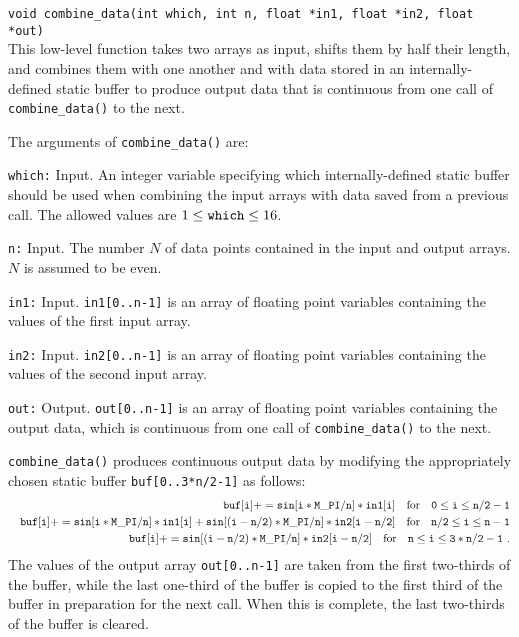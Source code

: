 {\tt void combine\_data(int which, int n, float *in1, float *in2, 
float *out)}\\
%
This low-level function takes two arrays as input, shifts them by half 
their length, and combines them with one another and with data stored in 
an internally-defined static buffer to produce output data that is 
continuous from one call of {\tt combine\_data()} to the next.

The arguments of {\tt combine\_data()} are:
\begin{description}
%
\item{\tt which:} Input.
An integer variable specifying which internally-defined static
buffer should be used when combining the input arrays with data
saved from a previous call.
The allowed values are $1\le{\tt which}\le 16$.
\item{\tt n:} Input. 
The number $N$ of data points contained in the input and output arrays.
$N$ is assumed to be even.
%
\item{\tt in1:} Input.  
{\tt in1[0..n-1]} is an array of floating point variables containing
the values of the first input array.
%
\item{\tt in2:} Input.  
{\tt in2[0..n-1]} is an array of floating point variables containing
the values of the second input array.
%
\item{\tt out:} Output.  
{\tt out[0..n-1]} is an array of floating point variables 
containing the output data, which is continuous from one call of
{\tt combine\_data()} to the next.
%
\end{description}

{\tt combine\_data()} produces continuous output data by modifying 
the appropriately chosen static buffer {\tt buf[0..3*n/2-1]} as follows:
%
\begin{eqnarray}
&&{\tt buf[i]+=sin[i*M\_PI/n]*in1[i]}\quad{\rm for}\quad
{\tt 0}\le{\tt i}\le{\tt n/2-1}\nonumber\\ 
&&{\tt buf[i]+=sin[i*M\_PI/n]*in1[i]+sin[(i-n/2)*M\_PI/n]*in2[i-n/2]}
\quad{\rm for}\quad{\tt n/2}\le{\tt i}\le{\tt n-1}\nonumber\\ 
&&{\tt buf[i]+=sin[(i-n/2)*M\_PI/n]*in2[i-n/2]}\quad{\rm for}\quad
{\tt n}\le{\tt i}\le{\tt 3*n/2-1}\ .\nonumber
\end{eqnarray} 
%
The values of the output array {\tt out[0..n-1]} are taken from the 
first two-thirds of the buffer, while the last one-third of the buffer
is copied to the first third of the buffer in preparation for the 
next call.
When this is complete, the last two-thirds of the buffer is cleared.

